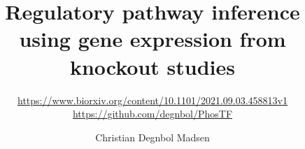 



\title{Regulatory pathway inference using gene expression from knockout studies}
\subtitle{\href{https://www.biorxiv.org/content/10.1101/2021.09.03.458813v1}{https://www.biorxiv.org/content/10.1101/2021.09.03.458813v1}\\
\href{https://github.com/degnbol/PhosTF}{https://github.com/degnbol/PhosTF}}
\author[Christian Degnbol Madsen]{
\centering
Christian Degnbol Madsen}
\date[August 29, 2019]{
\centering}


\begin{frame}
\maketitle

\end{frame}

